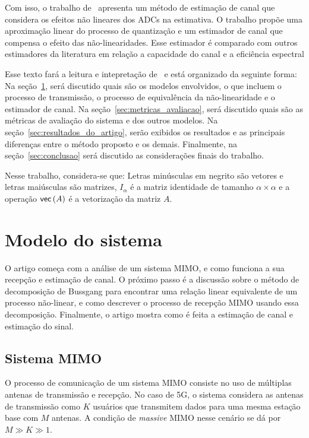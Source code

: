 \documentclass{article}
\begin{document}
	Com isso, o trabalho de~\cite{li.etal_2017a} apresenta um método de estimação de canal que considera os efeitos não lineares dos ADCs na estimativa. O trabalho propõe uma aproximação linear do processo de quantização e um estimador de canal que compensa o efeito das não-linearidades. Esse estimador é comparado com outros estimadores da literatura em relação a capacidade do canal e a eficiência espectral

	Esse texto fará a leitura e intepretação de~\cite{li.etal_2017a} e está organizado da seguinte forma:
	Na seção~\ref{sec:modelo_sistema}, será discutido quais são os modelos envolvidos, o que incluem o processo de transmissão, o processo de equivalência da não-linearidade e o estimador de canal. 
	Na seção~\ref{sec:metricas_avaliacao}, será discutido quais são as métricas de avaliação do sistema e dos outros modelos. 
	Na seção~\ref{sec:resultados_do_artigo}, serão exibidos os resultados e as principais diferenças entre o método proposto e os demais. 
	Finalmente, na seção~\ref{sec:conclusao} será discutido as considerações finais do trabalho.

	Nesse trabalho, considera-se que:
	Letras minúsculas em negrito são vetores e letras maiúsculas são matrizes,
	$I_\alpha$ é a matriz identidade de tamanho $\alpha\times\alpha$ e
	a operação $ \mathsf{vec} \left( A \right) $ é a vetorização da matriz $A$.

	\section{Modelo do sistema}
	\label{sec:modelo_sistema}
	
	O artigo começa com a análise de um sistema MIMO, e como funciona a sua recepção e estimação de canal. O próximo passo é a discussão sobre o método de decomposição de Bussgang para encontrar uma relação linear equivalente de um processo não-linear, e como descrever o processo de recepção MIMO usando essa decomposição. Finalmente, o artigo mostra como é feita a estimação de canal e estimação do sinal.

	\subsection{Sistema MIMO}
	\label{sec:modelo_sistema_mimo}

	O processo de comunicação de um sistema MIMO consiste no uso de múltiplas antenas de transmissão e recepção. No caso de 5G, o sistema considera as antenas de transmissão como $K$ usuários que transmitem dados para uma mesma estação base com $M$ antenas. A condição de \textit{massive} MIMO nesse cenário se dá por $M\gg K\gg1$.   
\end{document}
